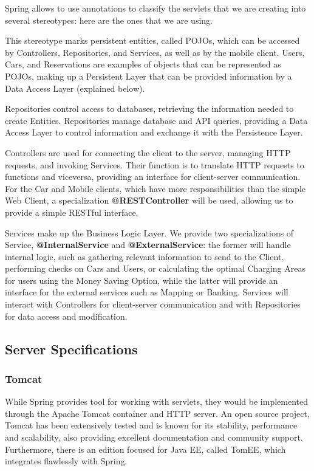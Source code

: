 \documentclass[12pt]{article}
\begin{document}
Spring allows to use annotations to classify the servlets that we are creating into several stereotypes: here are the ones that we are using.
\begin{description}[leftmargin=!,labelwidth=\widthof{\bfseries @Repository}]
	\item[@Entity] This stereotype marks persistent entities, called POJOs, which can be accessed by Controllers, Repositories, and Services, as well as by the mobile client. Users, Cars, and Reservations are examples of objects that can be represented as POJOs, making up a Persistent Layer that can be provided information by a Data Access Layer (explained below).
	\item[@Repository] Repositories control access to databases, retrieving the information needed to create Entities. Repositories manage database and API queries, providing a Data Access Layer to control information and exchange it with the Persistence Layer.
	\item[@Controller] Controllers are used for connecting the client to the server, managing HTTP requests, and invoking Services. Their function is to translate HTTP requests to functions and viceversa, providing an interface for client-server communication. For the Car and Mobile clients, which have more responsibilities than the simple Web Client, a specialization \textbf{@RESTController} will be used, allowing us to provide a simple RESTful interface.
	\item[@Service] Services make up the Business Logic Layer. We provide two specializations of Service, \textbf{@InternalService} and \textbf{@ExternalService}: the former will handle internal logic, such as gathering relevant information to send to the Client, performing checks on Cars and Users, or calculating the optimal Charging Areas for users using the Money Saving Option, while the latter will provide an interface for the external services such as Mapping or Banking. Services will interact with Controllers for client-server communication and with Repositories for data access and modification.
\end{description}

\subsection{Server Specifications}
\subsubsection{Tomcat}
While Spring provides tool for working with servlets, they would be implemented through the Apache Tomcat container and HTTP server. An open source project, Tomcat has been extensively tested and is known for its stability, performance and scalability, also providing excellent documentation and community support. Furthermore, there is an edition focused for Java EE, called TomEE, which integrates flawlessly with Spring.
\end{document}
